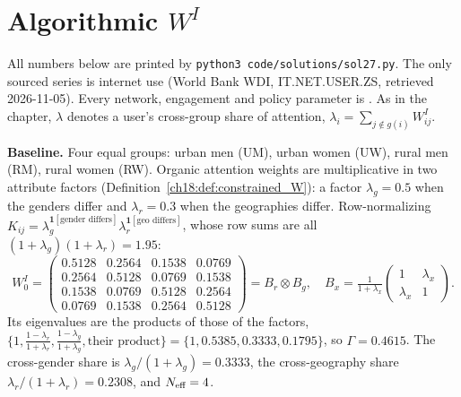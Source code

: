 \documentclass[../solutions_manual.tex]{subfiles}
\begin{document}
\ifSubfilesClassLoaded{\setcounter{chapter}{26}}{}%
\setcounter{chapter}{26}%
\chapter{Algorithmic $W^I$}\label{sol27}
\begingroup\sloppy

All numbers below are printed by \texttt{python3 code/solutions/sol27.py}. The only sourced series is internet use (World Bank WDI, IT.NET.USER.ZS, retrieved 2026-11-05). Every network, engagement and policy parameter is \illustrative. As in the chapter, $\lambda$ denotes a user's cross-group share of attention, $\lambda_i = \sum_{j \notin g(i)}W^I_{ij}$.


 \textbf{Baseline.} Four equal groups: urban men (UM), urban women (UW), rural men (RM), rural women (RW). Organic attention weights are multiplicative in two attribute factors (Definition~\ref{ch18:def:constrained_W}): a factor $\lambda_g = 0.5$ when the genders differ and $\lambda_r = 0.3$ when the geographies differ. Row-normalizing $K_{ij} = \lambda_g^{\mathbf{1}[\text{gender differs}]}\lambda_r^{\mathbf{1}[\text{geo differs}]}$, whose row sums are all $(1+\lambda_g)(1+\lambda_r) = 1.95$:
\[
W^I_0 = \begin{pmatrix}
0.5128 & 0.2564 & 0.1538 & 0.0769\\
0.2564 & 0.5128 & 0.0769 & 0.1538\\
0.1538 & 0.0769 & 0.5128 & 0.2564\\
0.0769 & 0.1538 & 0.2564 & 0.5128
\end{pmatrix} = B_r \otimes B_g,\quad B_x = \tfrac{1}{1+\lambda_x}\begin{pmatrix}1 & \lambda_x\\ \lambda_x & 1\end{pmatrix}.
\]
Its eigenvalues are the products of those of the factors, $\{1, \tfrac{1-\lambda_r}{1+\lambda_r}, \tfrac{1-\lambda_g}{1+\lambda_g}, \text{their product}\} = \{1, 0.5385, 0.3333, 0.1795\}$, so $\Gamma = 0.4615$. The cross-gender share is $\lambda_g/(1+\lambda_g) = 0.3333$, the cross-geography share $\lambda_r/(1+\lambda_r) = 0.2308$, and $N_{\text{eff}} = 4$.
\end{document}
